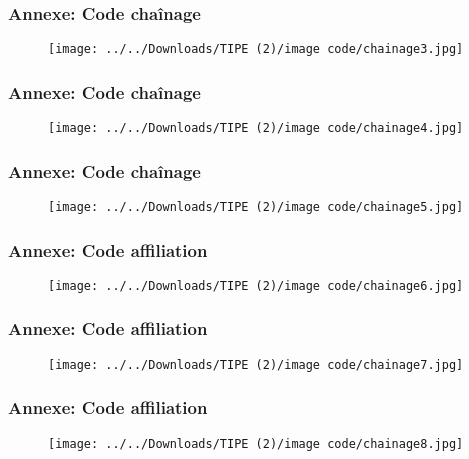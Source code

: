 \documentclass{beamer}
\begin{document}
\begin{frame}[fragile]
\frametitle{Annexe: Code chaînage}
\begin{figure}[h]
    \begin{minipage}[c]{.46\linewidth}
        \centering
        \texttt{[image: ../../Downloads/TIPE (2)/image code/chainage3.jpg]}

    \end{minipage}
\end{figure}
\end{frame}

\begin{frame}[fragile]
\frametitle{Annexe: Code chaînage}
\begin{figure}[h]
    \begin{minipage}[c]{.46\linewidth}
        \centering
        \texttt{[image: ../../Downloads/TIPE (2)/image code/chainage4.jpg]}

    \end{minipage}
\end{figure}
\end{frame}

\begin{frame}[fragile]
\frametitle{Annexe: Code chaînage}
\begin{figure}[h]
    \begin{minipage}[c]{.46\linewidth}
        \centering
        \texttt{[image: ../../Downloads/TIPE (2)/image code/chainage5.jpg]}

    \end{minipage}
\end{figure}
\end{frame}

\begin{frame}[fragile]
\frametitle{Annexe: Code affiliation}
\begin{figure}[h]
    \begin{minipage}[c]{.46\linewidth}
        \centering
        \texttt{[image: ../../Downloads/TIPE (2)/image code/chainage6.jpg]}

    \end{minipage}
\end{figure}
\end{frame}

\begin{frame}[fragile]
\frametitle{Annexe: Code affiliation}
\begin{figure}[h]
    \begin{minipage}[c]{.46\linewidth}
        \centering
        \texttt{[image: ../../Downloads/TIPE (2)/image code/chainage7.jpg]}

    \end{minipage}
\end{figure}
\end{frame}

\begin{frame}[fragile]
\frametitle{Annexe: Code affiliation}
\begin{figure}[h]
    \begin{minipage}[c]{.46\linewidth}
        \centering
        \texttt{[image: ../../Downloads/TIPE (2)/image code/chainage8.jpg]}

    \end{minipage}
\end{figure}
\end{frame}
\end{document}
